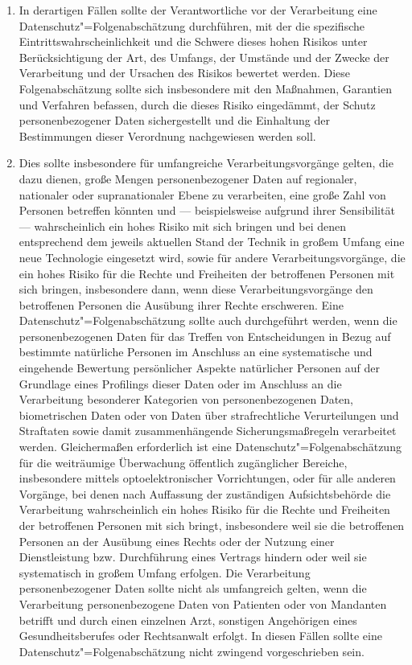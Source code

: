 \begin{enumerate}

   \item In derartigen Fällen sollte der Verantwortliche vor der Verarbeitung eine Datenschutz"=Folgenabschätzung
    durchführen, mit der die spezifische Eintrittswahrscheinlichkeit und die Schwere dieses hohen Risikos unter
    Berücksichtigung der Art, des Umfangs, der Umstände und der Zwecke der Verarbeitung und der Ursachen des Risikos
    bewertet werden. Diese Folgenabschätzung sollte sich insbesondere mit den Maßnahmen, Garantien und Verfahren
    befassen, durch die dieses Risiko eingedämmt, der Schutz personenbezogener Daten sichergestellt und die Einhaltung
    der Bestimmungen dieser Verordnung nachgewiesen werden soll.%
   \label{itm:eg-90}
   

   \item Dies sollte insbesondere für umfangreiche Verarbeitungsvorgänge gelten, die dazu dienen, große Mengen
    personenbezogener Daten auf regionaler, nationaler oder supranationaler Ebene zu verarbeiten, eine große Zahl von
    Personen betreffen könnten und — beispielsweise aufgrund ihrer Sensibilität — wahrscheinlich ein hohes Risiko mit
    sich bringen und bei denen entsprechend dem jeweils aktuellen Stand der Technik in großem Umfang eine neue
    Technologie eingesetzt wird, sowie für andere Verarbeitungsvorgänge, die ein hohes Risiko für die Rechte und
    Freiheiten der betroffenen Personen mit sich bringen, insbesondere dann, wenn diese Verarbeitungsvorgänge den
    betroffenen Personen die Ausübung ihrer Rechte erschweren. Eine Datenschutz"=Folgenabschätzung sollte auch
    durchgeführt werden, wenn die personenbezogenen Daten für das Treffen von Entscheidungen in Bezug auf bestimmte
    natürliche Personen im Anschluss an eine systematische und eingehende Bewertung persönlicher Aspekte natürlicher
    Personen auf der Grundlage eines Profilings dieser Daten oder im Anschluss an die Verarbeitung besonderer
    Kategorien von personenbezogenen Daten, biometrischen Daten oder von Daten über strafrechtliche Verurteilungen und
    Straftaten sowie damit zusammenhängende Sicherungsmaßregeln verarbeitet werden. Gleichermaßen erforderlich ist eine
    Datenschutz"=Folgenabschätzung für die weiträumige Überwachung öffentlich zugänglicher Bereiche, insbesondere
    mittels optoelektronischer Vorrichtungen, oder für alle anderen Vorgänge, bei denen nach Auffassung der zuständigen
    Aufsichtsbehörde die Verarbeitung wahrscheinlich ein hohes Risiko für die Rechte und Freiheiten der betroffenen
    Personen mit sich bringt, insbesondere weil sie die betroffenen Personen an der Ausübung eines Rechts oder der
    Nutzung einer Dienstleistung bzw. Durchführung eines Vertrags hindern oder weil sie systematisch in großem Umfang
    erfolgen. Die Verarbeitung personenbezogener Daten sollte nicht als umfangreich gelten, wenn die Verarbeitung
    personenbezogene Daten von Patienten oder von Mandanten betrifft und durch einen einzelnen Arzt, sonstigen
    Angehörigen eines Gesundheitsberufes oder Rechtsanwalt erfolgt. In diesen Fällen sollte eine
    Datenschutz"=Folgenabschätzung nicht zwingend vorgeschrieben sein.%
   \label{itm:eg-91}
   

\end{enumerate}
